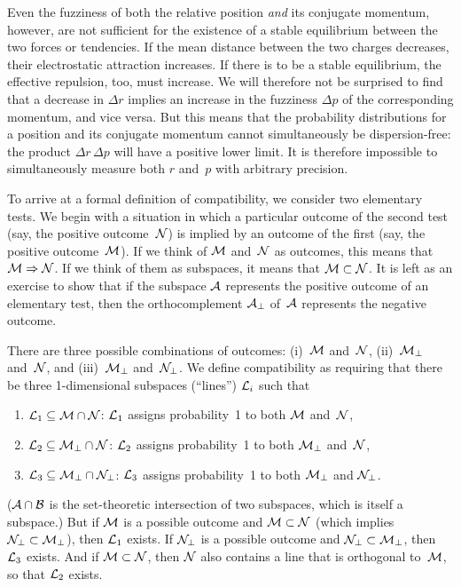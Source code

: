 \documentclass[12pt]{article}
\newcommand{\ben}{\begin{enumerate}}
\newcommand{\een}{\end{enumerate}}
\newcommand{\cA}{{\cal A}}
\newcommand{\cB}{{\cal B}}
\newcommand{\cL}{{\cal L}}
\newcommand{\cM}{{\cal M}}
\newcommand{\cN}{{\cal N}}
\begin{document}
Even the fuzziness of both the relative position \textit{and} its conjugate momentum, however, are not sufficient for the existence of a stable equilibrium between the two forces or tendencies. If the mean distance between the two charges decreases, their electrostatic attraction increases. If there is to be a stable equilibrium, the effective repulsion, too, must increase. We will therefore not be surprised to find that a decrease in $\Delta r$ implies an increase in the fuzziness $\Delta p$ of the corresponding momentum, and vice versa. But this means that the probability distributions for a position and its conjugate momentum cannot simultaneously be dispersion-free: the product $\Delta r\,\Delta p$ will have a positive lower limit. It is therefore impossible to simultaneously measure both $r$ and~$p$ with arbitrary precision.

To arrive at a formal definition of compatibility, we consider two elementary tests. We begin with a situation in which a particular outcome of the second test (say, the positive outcome~$\cN$) is implied by an outcome of the first (say, the positive outcome~$\cM$). If we think of $\cM$ and~$\cN$ as outcomes, this means that $\cM\Rightarrow\cN$. If we think of them as subspaces, it means that $\cM\subset\cN$. It is left as an exercise to show that if the subspace $\cA$ represents the positive outcome of an elementary test, then the orthocomplement $\cA_\perp$ of~$\cA$ represents the negative outcome.

There are three possible combinations of outcomes: (i)~$\cM$ and~$\cN$, (ii)~$\cM_\perp$ and~$\cN$, and (iii)~$\cM_\perp$ and~$\cN_\perp$. We define compatibility as requiring that there be three 1-dimensional subspaces (``lines'') $\cL_i$ such that
\ben
\item $\cL_1\subseteq\cM\cap\cN$: $\cL_1$ assigns probability~1 to both $\cM$ and~$\cN$,
\item $\cL_2\subseteq\cM_\perp\cap\cN$: $\cL_2$ assigns probability~1 to both $\cM_\perp$ and~$\cN$,
\item $\cL_3\subseteq\cM_\perp\cap\cN_\perp$: $\cL_3$ assigns probability~1 to both $\cM_\perp$ and $\cN_\perp$.
\een
($\cA\cap\cB$ is the set-theoretic intersection of two subspaces, which is itself a subspace.) But if $\cM$ is a possible outcome and $\cM\subset\cN$ (which implies $\cN_\perp\subset\cM_\perp$), then $\cL_1$ exists. If $\cN_\perp$ is a possible outcome and $\cN_\perp\subset\cM_\perp$, then $\cL_3$ exists. And if $\cM\subset\cN$, then $\cN$ also contains a line that is orthogonal to~$\cM$, so that $\cL_2$ exists.
\end{document}
